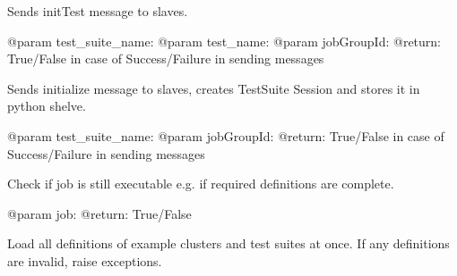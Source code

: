 \documentclass[a4paper,11pt,openany]{sphinxmanual}
\begin{document}
\begin{fulllineitems}
\begin{fulllineitems}
\label{ref-manual/XrdTestMaster:XrdTestMaster.XrdTestMaster.initializeTestCase}
Sends initTest message to slaves.

@param test\_suite\_name:
@param test\_name:
@param jobGroupId:
@return: True/False in case of Success/Failure in sending messages

\end{fulllineitems}


\begin{fulllineitems}
\label{ref-manual/XrdTestMaster:XrdTestMaster.XrdTestMaster.initializeTestSuite}
Sends initialize message to slaves, creates TestSuite Session
and stores it in python shelve.

@param test\_suite\_name:
@param jobGroupId:
@return: True/False in case of Success/Failure in sending messages

\end{fulllineitems}


\begin{fulllineitems}
\label{ref-manual/XrdTestMaster:XrdTestMaster.XrdTestMaster.isJobValid}
Check if job is still executable e.g. if required definitions
are complete.

@param job:
@return: True/False

\end{fulllineitems}


\begin{fulllineitems}
\label{ref-manual/XrdTestMaster:XrdTestMaster.XrdTestMaster.loadDefinitions}
Load all definitions of example clusters and test suites at once.
If any definitions are invalid, raise exceptions.

\end{fulllineitems}



\end{fulllineitems}
\end{document}
